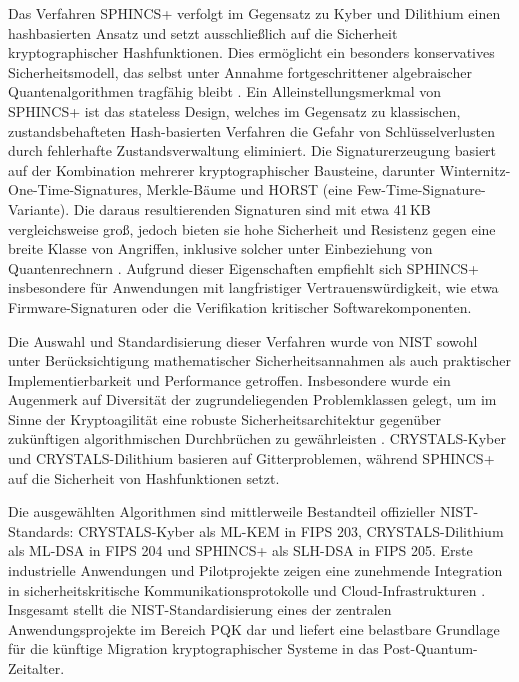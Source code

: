 Das Verfahren SPHINCS+ verfolgt im Gegensatz zu Kyber und Dilithium einen hashbasierten Ansatz und setzt ausschließlich auf die Sicherheit kryptographischer Hashfunktionen. Dies ermöglicht ein besonders konservatives Sicherheitsmodell, das selbst unter Annahme fortgeschrittener algebraischer Quantenalgorithmen tragfähig bleibt \cite[s. 1-2]{schwabe_sphincs_2025}. Ein Alleinstellungsmerkmal von SPHINCS+ ist das stateless Design, welches im Gegensatz zu klassischen, zustandsbehafteten Hash-basierten Verfahren die Gefahr von Schlüsselverlusten durch fehlerhafte Zustandsverwaltung eliminiert. Die Signaturerzeugung basiert auf der Kombination mehrerer kryptographischer Bausteine, darunter Winternitz-One-Time-Signatures, Merkle-Bäume und HORST (eine Few-Time-Signature-Variante). Die daraus resultierenden Signaturen sind mit etwa 41 KB vergleichsweise groß, jedoch bieten sie hohe Sicherheit und Resistenz gegen eine breite Klasse von Angriffen, inklusive solcher unter Einbeziehung von Quantenrechnern \cite[S. 4-5]{schwabe_sphincs_2025}. Aufgrund dieser Eigenschaften empfiehlt sich SPHINCS+ insbesondere für Anwendungen mit langfristiger Vertrauenswürdigkeit, wie etwa Firmware-Signaturen oder die Verifikation kritischer Softwarekomponenten.

Die Auswahl und Standardisierung dieser Verfahren wurde von NIST sowohl unter Berücksichtigung mathematischer Sicherheitsannahmen als auch praktischer Implementierbarkeit und Performance getroffen. Insbesondere wurde ein Augenmerk auf Diversität der zugrundeliegenden Problemklassen gelegt, um im Sinne der Kryptoagilität eine robuste Sicherheitsarchitektur gegenüber zukünftigen algorithmischen Durchbrüchen zu gewährleisten \cite[S. 4, 9]{alagic_status_2025}. CRYSTALS-Kyber und CRYSTALS-Dilithium basieren auf Gitterproblemen, während SPHINCS+ auf die Sicherheit von Hashfunktionen setzt.

Die ausgewählten Algorithmen sind mittlerweile Bestandteil offizieller NIST-Standards: CRYSTALS-Kyber als ML-KEM in FIPS 203, CRYSTALS-Dilithium als ML-DSA in FIPS 204 und SPHINCS+ als SLH-DSA in FIPS 205. Erste industrielle Anwendungen und Pilotprojekte zeigen eine zunehmende Integration in sicherheitskritische Kommunikationsprotokolle und Cloud-Infrastrukturen \cite{alagic_status_2025, sullivan_securing_2020, weibel_round_2020}. Insgesamt stellt die NIST-Standardisierung eines der zentralen Anwendungsprojekte im Bereich PQK dar und liefert eine belastbare Grundlage für die künftige Migration kryptographischer Systeme in das Post-Quantum-Zeitalter.


